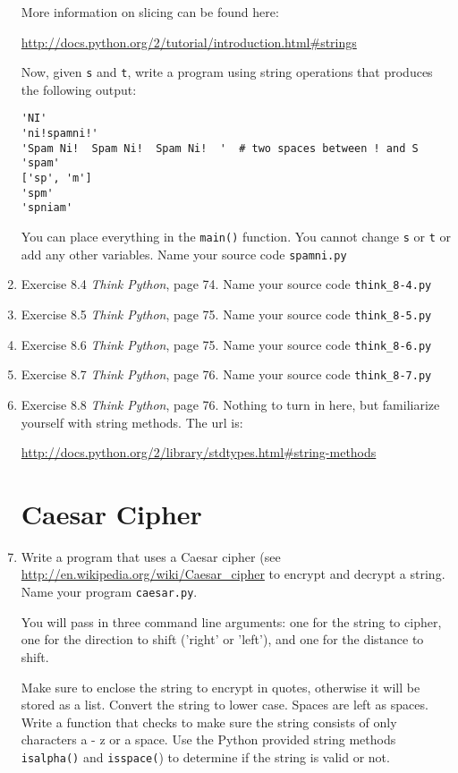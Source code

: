 \documentclass[12pt]{article}
\begin{document}
\begin{enumerate}
More information on slicing can be found here:

\url{http://docs.python.org/2/tutorial/introduction.html#strings}

Now, given \texttt{s} and \texttt{t}, write a program using string operations that produces the following output:

\begin{verbatim}
'NI'
'ni!spamni!'
'Spam Ni!  Spam Ni!  Spam Ni!  '  # two spaces between ! and S
'spam'
['sp', 'm']
'spm'
'spniam'
\end{verbatim}


You can place everything in the \texttt{main()} function. You cannot change \texttt{s} or \texttt{t} or add any other variables. Name your source code \texttt{spamni.py}

\item Exercise 8.4 \emph{Think Python}, page 74. Name your source code \texttt{think\_8-4.py}

\item Exercise 8.5 \emph{Think Python}, page 75. Name your source code \texttt{think\_8-5.py}

\item Exercise 8.6 \emph{Think Python}, page 75. Name your source code \texttt{think\_8-6.py}

\item Exercise 8.7 \emph{Think Python}, page 76. Name your source code \texttt{think\_8-7.py}

\item Exercise 8.8 \emph{Think Python}, page 76. Nothing to turn in here, but familiarize yourself with string methods. The url is:

  \url{http://docs.python.org/2/library/stdtypes.html#string-methods}


\section*{Caesar Cipher}

\item Write a program that uses a Caesar cipher (see \url{http://en.wikipedia.org/wiki/Caesar_cipher} to encrypt and decrypt a string. Name your program \texttt{caesar.py}. 
  
You will pass in three command line arguments: one for the string to cipher, one for the direction to shift ('right' or 'left'), and one for the distance to shift. 
  
Make sure to enclose the string to encrypt in quotes, otherwise it will be stored as a list. Convert the string to lower case. Spaces are left as spaces. Write a function that checks to make sure the string
  consists of only characters a - z or a space. Use the Python provided string methods \texttt{isalpha()} and \texttt{isspace(}) to determine if the string is valid or not. 


\end{enumerate}
\end{document}
